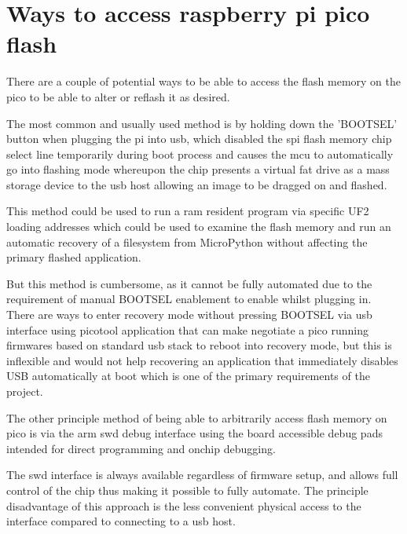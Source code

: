 \clearpage
\section{Ways to access raspberry pi pico flash}

There are a couple of potential ways to be able to access the flash memory on the pico to be able to alter or reflash it as desired.

The most common and usually used method is by holding down the 'BOOTSEL' button when plugging the pi into \gls{usb}, which disabled the \gls{spi} flash memory chip select line temporarily during boot process and causes the \gls{mcu} to automatically go into flashing mode whereupon the chip presents a virtual fat drive as a mass storage device to the \gls{usb} host allowing an image to be dragged on and flashed.

This method could be used to run a \gls{ram} resident program via specific UF2 loading addresses which could be used to examine the flash memory and run an automatic recovery of a filesystem from MicroPython without affecting the primary flashed application.

But this method is cumbersome, as it cannot be fully automated due to the requirement of manual BOOTSEL enablement to enable whilst plugging in. There are ways to enter recovery mode without pressing BOOTSEL via \gls{usb} interface using picotool application that can make negotiate a pico running firmwares based on standard \gls{usb} stack to reboot into recovery mode\cite{picotool}, but this is inflexible and would not help recovering an application that immediately disables USB automatically at boot which is one of the primary requirements of the project.

The other principle method of being able to arbitrarily access flash memory on pico is via the \gls{arm} \gls{swd} debug interface using the board accessible debug pads intended for direct programming and onchip debugging\cite{ARMDebugInterface}.

The \gls{swd} interface  is always available regardless of firmware setup, and allows full control of the chip thus making it possible to fully automate. The principle disadvantage of this approach is the less convenient physical access to the interface compared to connecting to a \gls{usb} host.
\clearpage
